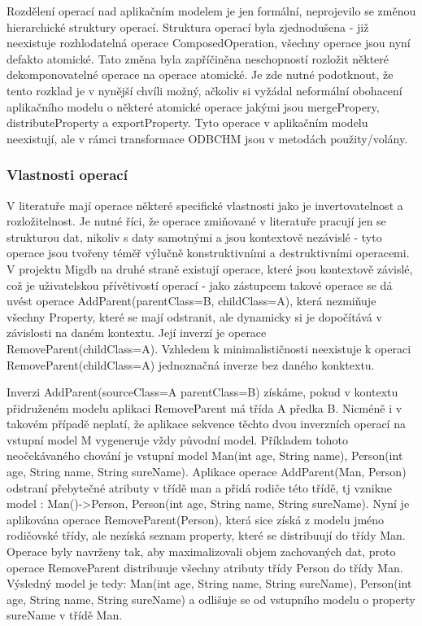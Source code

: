 \documentclass[11pt,twoside,a4paper]{book}
\begin{document}
Rozdělení operací nad aplikačním modelem je jen formální, neprojevilo se změnou
hierarchické struktury operací. Struktura operací byla zjednodušena - již
neexistuje rozhlodatelná operace ComposedOperation, všechny operace jsou nyní
defakto atomické. Tato změna byla zapříčiněna neschopností rozložit některé
dekomponovatelné operace na operace atomické. Je zde nutné podotknout, že tento
rozklad je v nynější chvíli možný, ačkoliv si vyžádal neformální
obohacení aplikačního modelu o některé atomické operace jakými jsou
mergePropery, distributeProperty a exportProperty. Tyto operace v aplikačním
modelu neexistují, ale v rámci transformace ODBCHM jsou v metodách
použity/volány.\\

\subsubsection{Vlastnosti operací}

V literatuře mají operace některé specifické vlastnosti jako je
invertovatelnost a rozložitelnost. Je nutné říci, že operace zmiňované v
literatuře pracují jen se strukturou dat, nikoliv s daty samotnými a jsou
kontextově nezávislé - tyto operace jsou tvořeny téměř výlučně konstruktivními
a destruktivními operacemi. V projektu Migdb na druhé straně existují operace, 
které jsou kontextově závislé, což je uživatelskou přívětivostí
operací - jako zástupcem takové operace se dá uvést operace
AddParent(parentClass=B, childClass=A), která nezmiňuje všechny Property, které
se mají odstranit, ale dynamicky si je dopočítává v závislosti na daném
kontextu. Její inverzí je operace RemoveParent(childClass=A). Vzhledem k
minimalističnosti neexistuje k operaci RemoveParent(childClass=A) jednoznačná 
inverze bez daného konktextu.

Inverzi AddParent(sourceClass=A parentClass=B) získáme, pokud v
kontextu přidruženém modelu aplikaci RemoveParent má třída A předka B. Nicméně i
v takovém případě neplatí, že aplikace sekvence těchto dvou inverzních operací
na vstupní model M vygeneruje vždy původní model. Příkladem tohoto neočekávaného
chování je vstupní model Man(int age, String name), Person(int age, String name, String sureName).
Aplikace operace AddParent(Man, Person) odstraní přebytečné atributy v třídě man
a přidá rodiče této třídě, tj vznikne model : Man()->Person, Person(int age,
String name, String sureName). Nyní je aplikována operace RemoveParent(Person),
která sice získá z modelu jméno rodičovské třídy, ale nezíská seznam property,
které se distribuují do třídy Man. Operace byly navrženy tak, aby maximalizovali
objem zachovaných dat, proto operace RemoveParent distribuuje všechny
atributy třídy Person do třídy Man. Výsledný model je tedy: Man(int age, String
name, String sureName), Person(int age, String name, String sureName) a odlišuje
se od vstupního modelu o property sureName v třídě Man.
\end{document}
